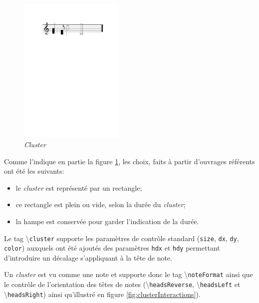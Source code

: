 \documentclass{article}
\newenvironment{gmncode}	{\vspace{-2mm}\small\verbatim}{\endverbatim\vspace{-2mm}}
\newcommand{\code}[1]		{{\small \texttt{#1}}}
\newcommand{\guidotag}[1]	{\textbackslash\code{#1}}
\begin{document}
\begin{figure}[h]
\centering
\begin{gmncode}
[
  \cluster({a, d} {c/8, f}
      {a/2, d2} {f/1, c1})
]
\end{gmncode}
\includegraphics[width=50mm]{img/partitions/cluster.pdf}
\caption{\emph{Cluster}}
\label{fig:cluster}
\end{figure}
%

Comme l'indique en partie la figure \ref{fig:cluster}, les choix, faits à partir d'ouvrages référents \cite{gould2011behind,stone1980music} ont été les suivants:
\begin{itemize}
	\item le \emph{cluster} est représenté par un rectangle;
	\item ce rectangle est plein ou vide, selon la durée du \emph{cluster};
	\item la hampe est conservée pour garder l'indication de la durée.
\end{itemize}

Le tag \guidotag{cluster} supporte les paramètres de contrôle standard (\code{size}, \code{dx}, \code{dy}, \code{color}) auxquels ont été ajoutés des paramètres \code{hdx} et \code{hdy} permettant d'introduire un décalage s'appliquant à la tête de note. 

Un \emph{cluster} est vu comme une note et supporte donc le tag \guidotag{noteFormat} ainsi que le contrôle de l'orientation des têtes de notes (\guidotag{headsReverse}, \guidotag{headsLeft} et \guidotag{headsRight}) ainsi qu'illustré en figure \ref{fig:clusterInteractions}).
\end{document}

